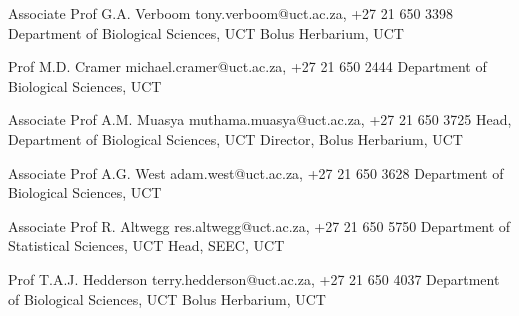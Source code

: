 \documentclass[10pt]{article}
\begin{document}
\begin{hangparas}{2em}{1}

{\small

Associate Prof G.A. Verboom
                           \hfill tony.verboom@uct.ac.za, +27 21 650 3398 \break
Department of Biological Sciences, UCT \break
Bolus Herbarium, UCT

Prof M.D. Cramer         \hfill michael.cramer@uct.ac.za, +27 21 650 2444 \break
Department of Biological Sciences, UCT

Associate Prof A.M. Muasya
                         \hfill muthama.muasya@uct.ac.za, +27 21 650 3725 \break
Head, Department of Biological Sciences, UCT \break
Director, Bolus Herbarium, UCT

Associate Prof A.G. West      \hfill adam.west@uct.ac.za, +27 21 650 3628 \break
Department of Biological Sciences, UCT

Associate Prof R. Altwegg   \hfill res.altwegg@uct.ac.za, +27 21 650 5750 \break
Department of Statistical Sciences, UCT \break
Head, SEEC, UCT

Prof T.A.J. Hedderson   \hfill terry.hedderson@uct.ac.za, +27 21 650 4037 \break
Department of Biological Sciences, UCT \break
Bolus Herbarium, UCT

}

\end{hangparas}

\bigskip

\hrulefill
\end{document}
